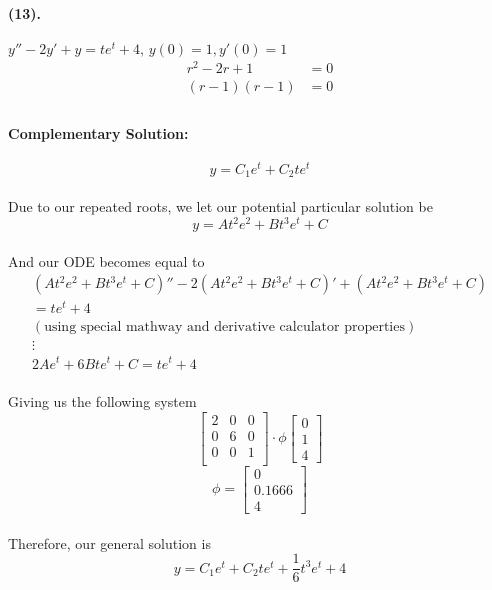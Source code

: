 \documentclass{article}
\begin{document}
\paragraph{(13).} $y''-2y'+y=te^t+4,\, y(0)=1, y'(0)=1$
\begin{align*}
    r^2 -2r + 1 &= 0\\
    (r-1)(r-1) &=0\\
\end{align*}
\paragraph{Complementary Solution:}
\[
    y = C_1e^{t} + C_2te^{t} 
\]
\paragraph{}Due to our repeated roots, we let our potential particular solution be
\[
    y = At^2e^2 + Bt^3e^t + C
\]
\paragraph{}And our ODE becomes equal to
\begin{align*}
    (At^2e^2 + Bt^3e^t + C)'' - 2( At^2e^2 + Bt^3e^t + C)' + ( At^2e^2 + Bt^3e^t + C)\\
    = te^t + 4\\
(\text{using special mathway and derivative calculator properties})\\
\vdots\\
    2Ae^t + 6Bte^t + C = te^t + 4
\end{align*}
\paragraph{}Giving us the following system
\[
  \begin{bmatrix}
    2 & 0 & 0\\
    0 & 6 & 0\\
    0 & 0 & 1\\
  \end{bmatrix}
  \cdot \phi
  \begin{bmatrix}
    0\\1\\4
  \end{bmatrix}
\]
\[
  \phi = 
  \begin{bmatrix}
    0\\0.1666\\4
  \end{bmatrix}
\]
\paragraph{}Therefore, our general solution is
\[
    y = C_1 e^{t} + C_2te^{t} + \frac{1}{6} t^3e^t + 4 
\]
\end{document}
